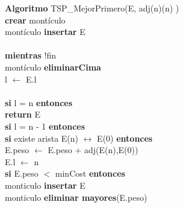 \documentclass[es]{ifirak}
\begin{document}
{		\textbf{Algoritmo} TSP\_MejorPrimero(E, adj(n)(n) )\\
		\hspace*{0.8cm}	 \textbf{crear} montículo\\ 
		\hspace*{0.8cm}	 montículo \textbf{insertar} E\\ 
		\\ 
		\hspace*{0.8cm}	 \textbf{mientras} !fin \\	
		\hspace*{0.6cm}\hspace*{0.8cm}  montículo \textbf{eliminarCima}\\ 
\hspace*{0.6cm}	\hspace*{0.8cm}	 l $\leftarrow$ E.l \\	
\\ 
	\hspace*{0.6cm}	\hspace*{0.8cm}	\textbf{si} l = n \textbf{entonces}\\ 
\hspace*{0.6cm}		\hspace*{0.4cm}\hspace*{2cm} \textbf{return} E\\
\hspace*{0.6cm}		\hspace*{0.8cm}	\textbf{si} l = n - 1 \textbf{entonces}\\ 
\hspace*{0.6cm}		\hspace*{2.4cm}	\textbf{si} existe arista E(n) $\leftrightarrow$ E(0) \textbf{entonces}\\
\hspace*{0.6cm}		\hspace*{3cm}	 E.peso $\leftarrow$ E.peso + adj(E(n),E(0)) \\ 
\hspace*{0.6cm}		\hspace*{3cm}	 E.l  $\leftarrow$ n \\	
\hspace*{0.6cm}		\hspace*{3cm}	\textbf{si}  E.peso  $<$ minCost \textbf{entonces}\\
\hspace*{0.6cm}		\hspace*{3.6cm} monticulo \textbf{insertar} E\\
\hspace*{0.6cm}		\hspace*{3.6cm} monticulo \textbf{eliminar mayores}(E.peso) \\
}
\end{document}
